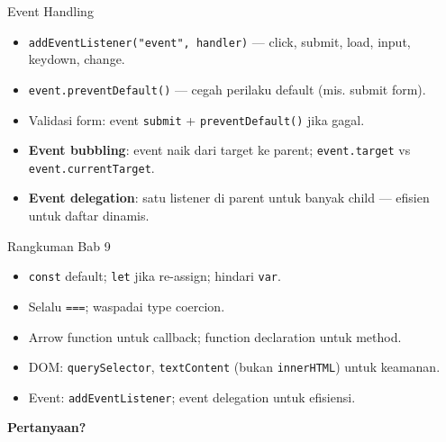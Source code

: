 \documentclass[handout]{beamer}
\begin{document}
\begin{frame}{Event Handling}
	\begin{itemize}
		\item \texttt{addEventListener("event", handler)} --- click, submit, load, input, keydown, change.
		\item \texttt{event.preventDefault()} --- cegah perilaku default (mis. submit form).
		\item Validasi form: event \texttt{submit} + \texttt{preventDefault()} jika gagal.
		\item \textbf{Event bubbling}: event naik dari target ke parent; \texttt{event.target} vs \texttt{event.currentTarget}.
		\item \textbf{Event delegation}: satu listener di parent untuk banyak child --- efisien untuk daftar dinamis.
	\end{itemize}
\end{frame}

\begin{frame}{Rangkuman Bab 9}
	\begin{itemize}
		\item \texttt{const} default; \texttt{let} jika re-assign; hindari \texttt{var}.
		\item Selalu \texttt{===}; waspadai type coercion.
		\item Arrow function untuk callback; function declaration untuk method.
		\item DOM: \texttt{querySelector}, \texttt{textContent} (bukan \texttt{innerHTML}) untuk keamanan.
		\item Event: \texttt{addEventListener}; event delegation untuk efisiensi.
	\end{itemize}
\end{frame}

\begin{frame}{}
	\centering
	\vfill
	\textbf{\Large Pertanyaan?}
	\vfill
\end{frame}
\end{document}
